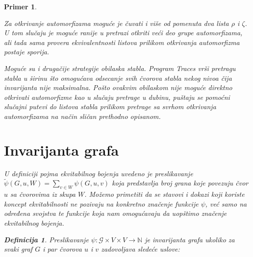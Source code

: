 \documentclass[12pt,oneside]{memoir}
\newtheorem{example}{Primer}
\theoremstyle{definition}
\newtheorem*{definition}{Definicija}
\begin{document}
\begin{example}
\begin{algorithm}[H]
\begin{algorithmic}[1]
			\If {$\zeta = ()$}
				\State {$\zeta \gets \nu$}
			\EndIf

			\EndIf
					\State {}
				\EndIf
				\State {}
			\EndIf

		  \EndIf
		  \State \Return{$|\nu|$}
		  \EndProcedure
	  \end{algorithmic}
  \end{algorithm}

  Za otkrivanje automorfizama moguće je čuvati i više od pomenuta dva lista
  $\rho$ i $\zeta$. U tom slučaju je moguće ranije u pretrazi otkriti veći deo
  grupe automorfizama, ali tada sama provera ekvivalentnosti listova prilikom
  otkrivanja automorfizma postaje sporija.

  Moguće su i drugačije strategije obilaska stabla. Program Traces vrši
  pretragu stabla u širinu što omogućava odsecanje svih čvorova stabla nekog
  nivoa čija invarijanta nije maksimalna. Pošto ovakvim obilaskom nije moguće
  direktno otkrivati automorfizme kao u slučaju pretrage u dubinu, puštaju se
  pomoćni slučajni putevi do listova stabla prilikom pretrage sa svrhom
  otkrivanja automorfizama na način sličan prethodno opisanom.

 \section{Invarijanta grafa}

  U definiciji pojma ekvitabilnog bojenja uvedeno je preslikavanje
  $\widetilde{\psi}(G, u, W) = \sum_{v \in W} \psi(G, u, v)$ koja predstavlja
  broj grana koje povezuju čvor $u$ sa čvorovima iz skupa $W$. Možemo primetiti
  da se stavovi i dokazi koji koriste koncept ekvitabilnosti ne pozivaju na
  konkretno značenje funkcije $\psi$, već samo na određena svojstva te funkcije
  koja nam omogućavaju da uopštimo značenje ekvitabilnog bojenja.

  \begin{definition}
	  Preslikavanje $\psi : \mathcal{G} \times V \times V \to \mathbb{N}$ je
	  \emph{invarijanta grafa} ukoliko za svaki graf $G$ i par čvorova $u$ i $v$
	  zadovoljava sledeće uslove:


\end{definition}
\end{example}
\end{document}
